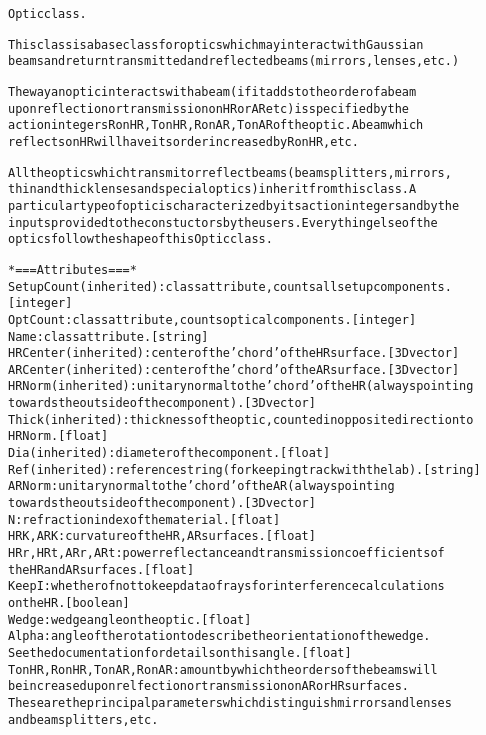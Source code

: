 \begin{alltt}


Optic class.

This class is a base class for optics which may interact with Gaussian
beams and return transmitted and reflected beams (mirrors, lenses, etc.)

The way an optic interacts with a beam (if it adds to the order of a beam
upon reflection or transmission on HR or AR etc) is specified by the
action integers RonHR, TonHR, RonAR, TonAR of the optic. A beam which
reflects on HR will have its order increased by RonHR, etc.

All the optics which transmit or reflect beams (beam splitters, mirrors,
thin and thick lenses and special optics) inherit from this class. A
particular type of optic is characterized by its action integers and by the
inputs provided to the constuctors by the users. Everything else of the
optics follow the shape of this Optic class.


*=== Attributes ===*
SetupCount (inherited): class attribute, counts all setup components.
    [integer]
OptCount: class attribute, counts optical components. [integer]
Name: class attribute. [string]
HRCenter (inherited): center of the 'chord' of the HR surface. [3D vector]
ARCenter (inherited): center of the 'chord' of the AR surface. [3D vector]
HRNorm (inherited): unitary normal to the 'chord' of the HR (always pointing
 towards the outside of the component). [3D vector]
Thick (inherited): thickness of the optic, counted in opposite direction to
    HRNorm. [float]
Dia (inherited): diameter of the component. [float]
Ref (inherited): reference string (for keeping track with the lab). [string]
ARNorm: unitary normal to the 'chord' of the AR (always pointing
 towards the outside of the component). [3D vector]
N: refraction index of the material. [float]
HRK, ARK: curvature of the HR, AR surfaces. [float]
HRr, HRt, ARr, ARt: power reflectance and transmission coefficients of
    the HR and AR surfaces. [float]
KeepI: whether of not to keep data of rays for interference calculations
        on the HR. [boolean]
Wedge: wedge angle on the optic. [float]
Alpha: angle of the rotation to describe the orientation of the wedge.
    See the documentation for details on this angle. [float]
TonHR, RonHR, TonAR, RonAR: amount by which the orders of the beams will
    be increased upon relfection or transmission on AR or HR surfaces.
    These are the principal parameters which distinguish mirrors and lenses
    and beamsplitters, etc.


\end{alltt}
